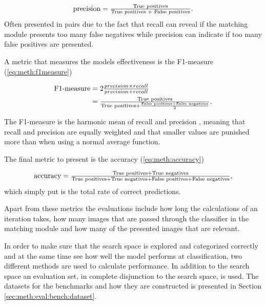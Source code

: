 \begin{equation}
\label{eq:meth:precision}
\textnormal{precision} = \tfrac{\textnormal{True positives}}{\textnormal{True positives } + \textnormal{ False positives}}.
\end{equation}
Often presented in pairs due to the fact that recall can reveal if the matching module presents too many false negatives while precision can indicate if too many false positives are presented. 

A metric that measures the models effectiveness is the F1-measure (\ref{eq:meth:f1measure})

\begin{equation}
\label{eq:meth:f1measure}
\begin{split}
\textnormal{F1-measure} &= 2 \tfrac{precision \times recall}{precision + recall}\\
&= \tfrac{\textnormal{True positives}}{\textnormal{True positives} +\frac{\textnormal{False positives}+\textnormal{False negatives}}{2}}.
\end{split}
\end{equation}

The F1-measure is the harmonic mean of recall and precision \cite{powers2011evaluation}, meaning that recall and precision are equally weighted and that smaller values are punished more than when using a normal average function. 

The final metric to present is the accuracy (\ref{eq:meth:accuracy}) 

\begin{equation}
\label{eq:meth:accuracy}
\textnormal{accuracy} = \tfrac{\textnormal{True positives} + \textnormal{True negatives}}{\textnormal{True positives} + \textnormal{True negatives}+ \textnormal{False positives} + \textnormal{False negatives}},
\end{equation}
which simply put is the total rate of correct predictions. 


Apart from these metrics the evaluations include how long the calculations of an iteration takes, how many images that are passed through the classifier in the matching module and how many of the presented images that are relevant.   

In order to make sure that the search space is explored and categorized correctly and at the same time see how well the model performs at classification, two different methods are used to calculate performance. In addition to the search space an evaluation set, in complete disjunction to the search space, is used. The datasets for the benchmarks and how they are constructed is presented in Section \ref{sec:meth:eval:bench:dataset}. 

